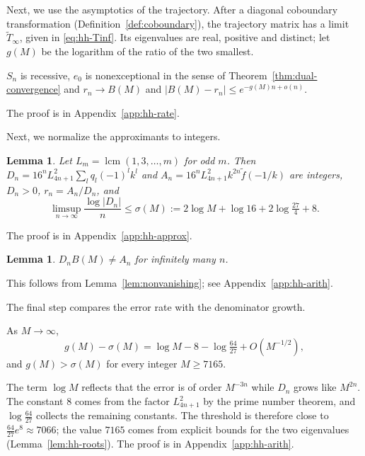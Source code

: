 \documentclass[oneside,english,11pt]{amsart}
\newtheorem{lemma}[thm]{Lemma}
\DeclareMathOperator{\lcm}{lcm}
\begin{document}
Next, we use the asymptotics of the trajectory. After a diagonal coboundary transformation (Definition~\ref{def:coboundary}), the trajectory matrix has a limit $\tilde T_\infty$, given in \eqref{eq:hh-Tinf}. Its eigenvalues are real, positive and distinct; let $g(M)$ be the logarithm of the ratio of the two smallest.

\begin{proposition}\label{prop:hh-rate}
$S_n$ is recessive, $e_0$ is nonexceptional in the sense of Theorem~\ref{thm:dual-convergence} 
and
$r_n\to B(M)$ and $|B(M)-r_n|\le e^{-g(M)n+o(n)}$.
\end{proposition}
The proof is in Appendix~\ref{app:hh-rate}.

Next, we normalize the approximants to integers.
\begin{lemma}\label{lem:hh-integers}
Let $L_m=\lcm(1,3,\dots,m)$ for odd $m$. Then
$D_n=16^nL_{4n+1}^2\sum_lq_l(-1)^lk^l$ and $A_n=16^nL_{4n+1}^2k^{2n}\tilde f(-1/k)$ are integers,
$D_n>0$, $r_n=A_n/D_n$, and
\[
 \limsup_{n\to\infty}\frac{\log|D_n|}n\le\sigma(M):=2\log M+\log16+2\log\tfrac{27}4+8.
\]
\end{lemma}
The proof is in Appendix~\ref{app:hh-approx}.

\begin{lemma}\label{lem:hh-nondeg}
$D_nB(M)\ne A_n$ for infinitely many $n$.
\end{lemma}

This follows from Lemma~\ref{lem:nonvanishing}; see Appendix~\ref{app:hh-arith}.

\noindent The final step compares the error rate with the denominator growth.

\begin{proposition}\label{prop:hh-gap}
As $M\to\infty$,
\[
 g(M)-\sigma(M)=\log M-8-\log\tfrac{64}{27}+O(M^{-1/2}),
\]
and $g(M)>\sigma(M)$ for every integer $M\ge7165$.
\end{proposition}
The term $\log M$ reflects that the error is of order $M^{-3n}$ while $D_n$ grows like $M^{2n}$. The constant $8$ comes from the factor $L_{4n+1}^2$ by the prime number theorem, and $\log\frac{64}{27}$ collects the remaining constants. The threshold is therefore close to $\frac{64}{27}e^8\approx7066$; the value $7165$ comes from explicit bounds for the two eigenvalues (Lemma~\ref{lem:hh-roots}). The proof is in Appendix~\ref{app:hh-arith}.
\end{document}
